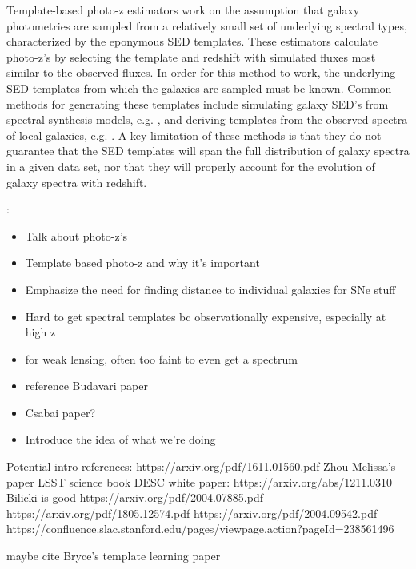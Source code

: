 
Template-based photo-z estimators work on the assumption that galaxy photometries are sampled from a relatively small set of underlying spectral types, characterized by the eponymous SED templates. 
These estimators calculate photo-z's by selecting the template and redshift with simulated fluxes most similar to the observed fluxes. 
In order for this method to work, the underlying SED templates from which the galaxies are sampled must be known. 
Common methods for generating these templates include simulating galaxy SED's from spectral synthesis models, e.g. \citet{BruzualA.1993}, and deriving templates from the observed spectra of local galaxies, e.g. \citet{Benitez2004}. 
A key limitation of these methods is that they do not guarantee that the SED templates will span the full distribution of galaxy spectra in a given data set, nor that they will properly account for the evolution of galaxy spectra with redshift.


:
\begin{itemize}
    \item Talk about photo-z's
    \item Template based photo-z and why it's important
    \item Emphasize the need for finding distance to individual galaxies for SNe stuff
    \item Hard to get spectral templates bc observationally expensive, especially at high z
    \item for weak lensing, often too faint to even get a spectrum
    \item reference Budavari paper
    \item Csabai paper?
    \item Introduce the idea of what we're doing
\end{itemize}


Potential intro references:
https://arxiv.org/pdf/1611.01560.pdf
Zhou
Melissa's paper
LSST science book
DESC white paper: https://arxiv.org/abs/1211.0310
Bilicki is good
https://arxiv.org/pdf/2004.07885.pdf
https://arxiv.org/pdf/1805.12574.pdf
https://arxiv.org/pdf/2004.09542.pdf
https://confluence.slac.stanford.edu/pages/viewpage.action?pageId=238561496

maybe cite Bryce's template learning paper
